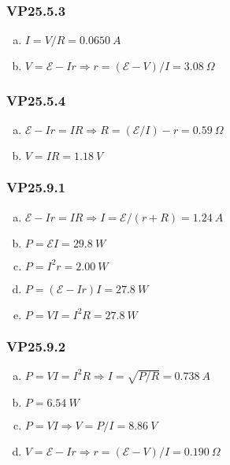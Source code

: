 \documentclass{article}
\begin{document}
\subsubsection{VP25.5.3}

\begin{enumerate}[(a)]
  \item $I = V / R = \qty{0.0650}{A}$

  \item $V = \mathcal{E} - I r \Rightarrow r = (\mathcal{E} - V) / I = \qty{3.08}{\Omega}$
\end{enumerate}

\subsubsection{VP25.5.4}

\begin{enumerate}[(a)]
  \item $\mathcal{E} - I r = I R \Rightarrow R = (\mathcal{E} / I) - r = \qty{0.59}{\Omega}$

  \item $V = I R = \qty{1.18}{V}$
\end{enumerate}

\subsubsection{VP25.9.1}

\begin{enumerate}[(a)]
  \item $\mathcal{E} - I r = I R \Rightarrow I = \mathcal{E} / (r + R) = \qty{1.24}{A}$

  \item $P = \mathcal{E} I = \qty{29.8}{W}$

  \item $P = I^2 r = \qty{2.00}{W}$

  \item $P = (\mathcal{E} - I r) I = \qty{27.8}{W}$

  \item $P = V I = I^2 R = \qty{27.8}{W}$
\end{enumerate}

\subsubsection{VP25.9.2}

\begin{enumerate}[(a)]
  \item $P = V I = I^2 R \Rightarrow I = \sqrt{P / R} = \qty{0.738}{A}$

  \item $P = \qty{6.54}{W}$

  \item $P = V I \Rightarrow V = P / I = \qty{8.86}{V}$

  \item $V = \mathcal{E} - I r \Rightarrow r = (\mathcal{E} - V) / I = \qty{0.190}{\Omega}$
\end{enumerate}
\end{document}
